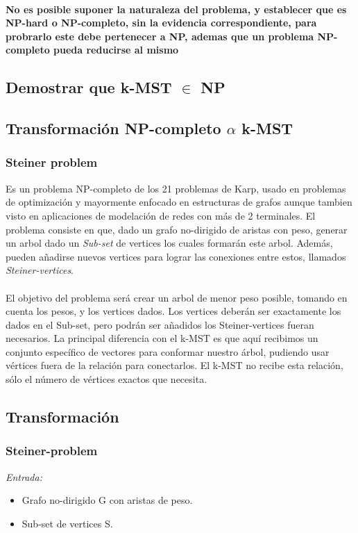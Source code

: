 \documentclass[spanish,12pt]{elsarticle}
\begin{document}
\paragraph{\textnormal{No es posible suponer la naturaleza del problema, y establecer que es NP-hard o NP-completo, sin la evidencia correspondiente, para probrarlo este debe pertenecer a NP, ademas que un problema NP-completo pueda reducirse al mismo}}
\subsection{Demostrar que k-MST $\in$ NP}


\subsection{Transformación NP-completo $\alpha$  k-MST}
\subsubsection{Steiner problem}
Es un problema NP-completo de los 21 problemas de Karp, usado en problemas de optimización y mayormente enfocado en estructuras de grafos aunque tambien visto en aplicaciones de modelación de redes con más de 2 terminales. El problema consiste en que,  dado un grafo no-dirigido de aristas con peso, generar un arbol dado un
\textit{Sub-set} de vertices los cuales formarán este arbol. Además, pueden añadirse nuevos vertices para lograr las conexiones entre estos, llamados \textit{Steiner-vertices}.\\\\
El objetivo del problema será crear un arbol de menor peso posible, tomando en cuenta los pesos, y los vertices dados. Los vertices deberán ser exactamente los dados en el Sub-set, pero podrán ser añadidos los Steiner-vertices fueran necesarios.
La principal diferencia con el k-MST es que aquí recibimos un conjunto específico de vectores para conformar nuestro árbol, pudiendo usar vértices fuera de la relación para conectarlos. El k-MST no recibe esta relación, sólo el número de vértices exactos que necesita.\\ 


\subsection{Transformación}
\subsubsection*{Steiner-problem}
\textit{Entrada: }
\begin{itemize}
\item Grafo no-dirigido G con aristas de peso.
\item Sub-set de vertices S.
\end{itemize}
\end{document}
